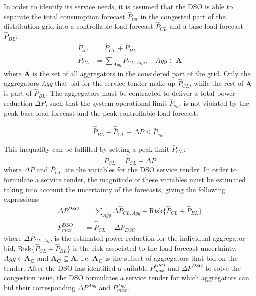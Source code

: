 In order to identify its service needs, it is assumed that the DSO is able to separate the total consumption forecast $\hat{P}_{tot}$ in the congested part of the distribution grid into a controllable load forecast $\hat{P}_{CL}$ and a base load forecast $\hat{P}_{BL}$:
\begin{align}
\hat{P}_{tot} &= \hat{P}_{CL} + \hat{P}_{BL} \\
\hat{P}_{CL} &= \sum_{Agg} \hat{P}_{CL,Agg}, \quad Agg \in \mathbf{A} \label{eq:CLDef}
\end{align}
where $\mathbf{A}$ is the set of all aggregators in the considered part of the grid. Only the aggregators \emph{Agg} that bid for the service tender make up $\hat{P}_{CL}$, while the rest of $\mathbf{A}$ is part of $\hat{P}_{BL}$. The aggregators must be contracted to deliver a total power reduction $\Delta P$, such that the system operational limit $\bar{P}_{sys}$ is not violated by the peak base load forecast and the peak controllable load forecast:

\begin{equation}
\hat{\bar{P}}_{BL}+\hat{\bar{P}}_{CL}-\Delta P \leq \bar{P}_{sys}. \label{eq:PSysDef}
\end{equation}

This inequality can be fulfilled by setting a peak limit $\bar{P}_{CL}$:
\begin{equation}
\bar{P}_{CL} = \hat{\bar{P}}_{CL} - \Delta P \label{eq:PBarCLDef}
\end{equation}
where $\Delta P$ and $\bar{P}_{CL}$ are the variables for the DSO service tender. In order to formulate a service tender, the magnitude of these variables must be estimated taking into account the uncertainty of the forecasts, giving the following expressions:
\begin{align}
\Delta P^{DSO} &= \sum_{Agg} \Delta \hat{P}_{CL,Agg} + \text{Risk\{}\hat{P}_{CL} + \hat{P}_{BL}\text{\}}\\
P_{max}^{DSO} &= \hat{\bar{P}}_{CL} - \Delta P_{DSO}
\end{align}
where $\Delta \hat{P}_{CL,Agg}$ is the estimated power reduction for the individual aggregator bid, $\text{Risk\{}\hat{P}_{CL} + \hat{P}_{BL}\text{\}}$ is the risk associated to the load forecast uncertainty. $Agg \in \mathbf{A_{C}}$ and $\mathbf{A_{C}} \subseteq \mathbf{A}$, i.e. $\mathbf{A_{C}}$ is the subset of aggregators that bid on the tender. After the DSO has identified a suitable $P_{max}^{DSO}$ and $\Delta P^{DSO}$ to solve the congestion issue, the DSO formulates a service tender for which aggregators can bid their corresponding $\Delta P^{Agg}$ and $P^{Agg}_{max}$. %

